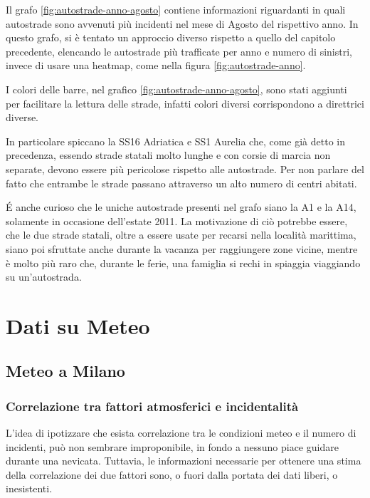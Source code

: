 \documentclass[a4paper,12pt]{report}
\begin{document}
Il grafo \ref{fig:autostrade-anno-agosto} contiene informazioni riguardanti 
in quali autostrade sono avvenuti più incidenti nel mese di Agosto del rispettivo anno. 
In questo grafo, si è tentato un approccio diverso rispetto a quello del capitolo precedente, 
elencando le autostrade più trafficate per anno e numero di sinistri, invece di usare una 
heatmap, come nella figura \ref{fig:autostrade-anno}.

I colori delle barre, nel grafico \ref{fig:autostrade-anno-agosto}, sono stati aggiunti per 
facilitare la lettura delle strade, infatti colori diversi corrispondono a direttrici diverse. 

In particolare spiccano la SS16 Adriatica e SS1 Aurelia che, come già 
detto in precedenza, essendo strade statali molto lunghe e con corsie di marcia 
non separate, devono essere più pericolose rispetto alle autostrade.
Per non parlare del fatto che entrambe le strade passano attraverso un 
alto numero di centri abitati.

\'E anche curioso che le uniche autostrade presenti nel grafo siano la A1 e la A14, 
solamente in occasione dell'estate 2011. 
La motivazione di ciò potrebbe essere, che le due strade statali, oltre a essere usate per 
recarsi nella località marittima, siano poi sfruttate anche durante la vacanza per 
raggiungere zone vicine, mentre è molto più raro che, durante le ferie, una famiglia 
si rechi in spiaggia viaggiando su un'autostrada.

\chapter{Dati su Meteo}

\section{Meteo a Milano}

\subsection{Correlazione tra fattori atmosferici e incidentalità}

L'idea di ipotizzare che esista correlazione tra le condizioni meteo e il numero 
di incidenti, può non sembrare improponibile, in fondo a nessuno piace guidare 
durante una nevicata.
Tuttavia, le informazioni necessarie per ottenere una stima della correlazione 
dei due fattori sono, o fuori dalla portata dei dati liberi, o inesistenti. 
\end{document}
